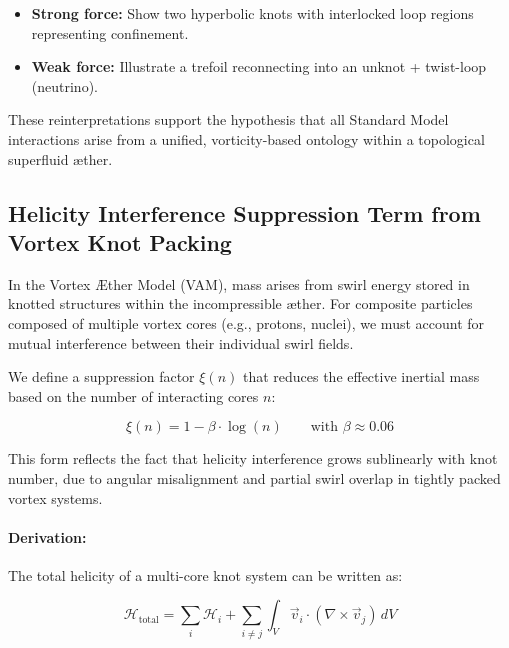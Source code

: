\documentclass[12pt]{article}
\begin{document}
\begin{itemize}
    \item \textbf{Strong force:} Show two hyperbolic knots with interlocked loop regions representing confinement.
    \item \textbf{Weak force:} Illustrate a trefoil reconnecting into an unknot + twist-loop (neutrino).
\end{itemize}

\bigskip

These reinterpretations support the hypothesis that all Standard Model interactions arise from a unified, vorticity-based ontology within a topological superfluid æther.







  \subsection*{Helicity Interference Suppression Term from Vortex Knot Packing}

In the Vortex Æther Model (VAM), mass arises from swirl energy stored in knotted structures within the incompressible æther. For composite particles composed of multiple vortex cores (e.g., protons, nuclei), we must account for mutual interference between their individual swirl fields.

We define a suppression factor \( \xi(n) \) that reduces the effective inertial mass based on the number of interacting cores \( n \):

\begin{equation}
\boxed{
\xi(n) = 1 - \beta \cdot \log(n)
}
\qquad \text{with } \beta \approx 0.06
\end{equation}

This form reflects the fact that helicity interference grows sublinearly with knot number, due to angular misalignment and partial swirl overlap in tightly packed vortex systems.

\paragraph{Derivation:}
The total helicity of a multi-core knot system can be written as:

\begin{equation}
\mathcal{H}_{\text{total}} = \sum_i \mathcal{H}_i + \sum_{i \neq j} \int_V \vec{v}_i \cdot (\nabla \times \vec{v}_j) \, dV
\end{equation}
\end{document}
